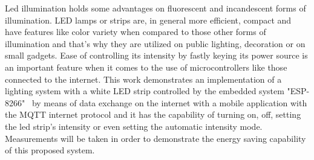 Led illumination holds some advantages on fluorescent and incandescent forms of illumination. LED lamps or strips are, in general more efficient, compact and have features like color variety when compared to those other forms of illumination and that's why they are utilized on public lighting, decoration or on small gadgets. Ease of controlling its intensity by fastly keying its power source is an important feature when it comes to the use of microcontrollers like those connected to the internet. This work demonstrates an implementation of a lighting system with a white LED strip controlled by the embedded system "ESP-8266"  by means of data exchange on the internet with a mobile application with the MQTT internet protocol and it has the capability of turning on, off, setting the led strip's intensity or even setting the automatic intensity mode. Measurements will be taken in order to demonstrate the energy saving capability of this proposed system. 